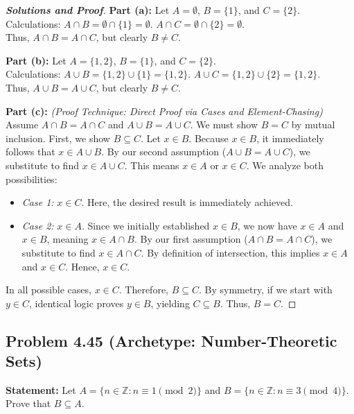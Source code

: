 \documentclass[11pt]{article}
\begin{document}
\begin{proof}[\textbf{Solutions and Proof}]
\textbf{Part (a):} Let $A = \emptyset$, $B = \{1\}$, and $C = \{2\}$. \\
Calculations: $A \cap B = \emptyset \cap \{1\} = \emptyset$. $A \cap C = \emptyset \cap \{2\} = \emptyset$. \\
Thus, $A \cap B = A \cap C$, but clearly $B \neq C$.

\textbf{Part (b):} Let $A = \{1, 2\}$, $B = \{1\}$, and $C = \{2\}$. \\
Calculations: $A \cup B = \{1, 2\} \cup \{1\} = \{1, 2\}$. $A \cup C = \{1, 2\} \cup \{2\} = \{1, 2\}$. \\
Thus, $A \cup B = A \cup C$, but clearly $B \neq C$.

\textbf{Part (c):} \textit{(Proof Technique: Direct Proof via Cases and Element-Chasing)} \\
Assume $A \cap B = A \cap C$ and $A \cup B = A \cup C$. We must show $B = C$ by mutual inclusion.
First, we show $B \subseteq C$. Let $x \in B$. 
Because $x \in B$, it immediately follows that $x \in A \cup B$. 
By our second assumption ($A \cup B = A \cup C$), we substitute to find $x \in A \cup C$. 
This means $x \in A$ or $x \in C$. We analyze both possibilities:
\begin{itemize}
    \item \textit{Case 1:} $x \in C$. Here, the desired result is immediately achieved.
    \item \textit{Case 2:} $x \in A$. Since we initially established $x \in B$, we now have $x \in A$ and $x \in B$, meaning $x \in A \cap B$. 
    By our first assumption ($A \cap B = A \cap C$), we substitute to find $x \in A \cap C$.
    By definition of intersection, this implies $x \in A$ and $x \in C$. Hence, $x \in C$.
\end{itemize}
In all possible cases, $x \in C$. Therefore, $B \subseteq C$.
By symmetry, if we start with $y \in C$, identical logic proves $y \in B$, yielding $C \subseteq B$.
Thus, $B = C$.
\end{proof}

\subsection{Problem 4.45 (Archetype: Number-Theoretic Sets)}
\textbf{Statement:} Let $A = \{n \in \mathbb{Z} : n \equiv 1 \pmod 2\}$ and $B = \{n \in \mathbb{Z} : n \equiv 3 \pmod 4\}$. Prove that $B \subseteq A$.
\end{document}
